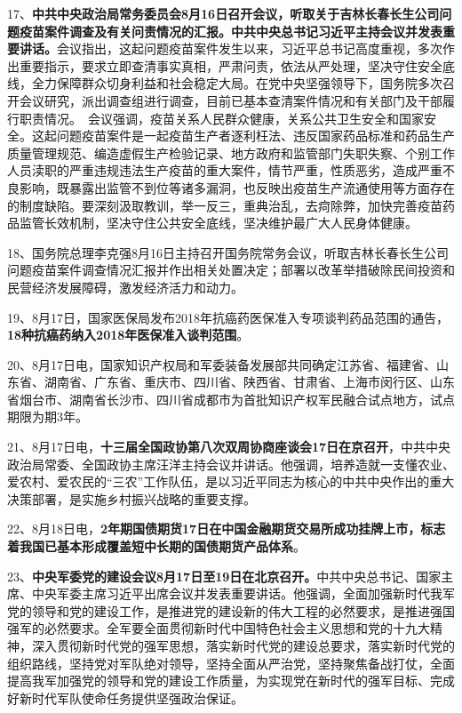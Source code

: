 17、{\textbf{中共中央政治局常务委员会8月16日召开会议，听取关于吉林长春长生公司问题疫苗案件调查及有关问责情况的汇报。中共中央总书记习近平主持会议并发表重要讲话。}}会议指出，这起问题疫苗案件发生以来，习近平总书记高度重视，多次作出重要指示，要求立即查清事实真相，严肃问责，依法从严处理，坚决守住安全底线，全力保障群众切身利益和社会稳定大局。在党中央坚强领导下，国务院多次召开会议研究，派出调查组进行调查，目前已基本查清案件情况和有关部门及干部履行职责情况。　会议强调，疫苗关系人民群众健康，关系公共卫生安全和国家安全。这起问题疫苗案件是一起疫苗生产者逐利枉法、违反国家药品标准和药品生产质量管理规范、编造虚假生产检验记录、地方政府和监管部门失职失察、个别工作人员渎职的严重违规违法生产疫苗的重大案件，情节严重，性质恶劣，造成严重不良影响，既暴露出监管不到位等诸多漏洞，也反映出疫苗生产流通使用等方面存在的制度缺陷。要深刻汲取教训，举一反三，重典治乱，去疴除弊，加快完善疫苗药品监管长效机制，坚决守住公共安全底线，坚决维护最广大人民身体健康。

18、国务院总理李克强8月16日主持召开国务院常务会议，听取吉林长春长生公司问题疫苗案件调查情况汇报并作出相关处置决定；部署以改革举措破除民间投资和民营经济发展障碍，激发经济活力和动力。

19、8月17日，国家医保局发布2018年抗癌药医保准入专项谈判药品范围的通告，\textbf{{18种抗癌药纳入2018年医保准入谈判范围}}。

20、8月17日电，国家知识产权局和军委装备发展部共同确定江苏省、福建省、山东省、湖南省、广东省、重庆市、四川省、陕西省、甘肃省、上海市闵行区、山东省烟台市、湖南省长沙市、四川省成都市为首批知识产权军民融合试点地方，试点期限为期3年。

21、8月17日电，{\textbf{十三届全国政协第八次双周协商座谈会17日在京召开}}，中共中央政治局常委、全国政协主席汪洋主持会议并讲话。他强调，培养造就一支懂农业、爱农村、爱农民的``三农''工作队伍，是以习近平同志为核心的中共中央作出的重大决策部署，是实施乡村振兴战略的重要支撑。

22、8月18日电，{\textbf{2年期国债期货17日在中国金融期货交易所成功挂牌上市，标志着我国已基本形成覆盖短中长期的国债期货产品体系}}。

23、{\textbf{中央军委党的建设会议8月17日至19日在北京召开。}}中共中央总书记、国家主席、中央军委主席习近平出席会议并发表重要讲话。他强调，全面加强新时代我军党的领导和党的建设工作，是推进党的建设新的伟大工程的必然要求，是推进强国强军的必然要求。全军要全面贯彻新时代中国特色社会主义思想和党的十九大精神，深入贯彻新时代党的强军思想，落实新时代党的建设总要求，落实新时代党的组织路线，坚持党对军队绝对领导，坚持全面从严治党，坚持聚焦备战打仗，全面提高我军加强党的领导和党的建设工作质量，为实现党在新时代的强军目标、完成好新时代军队使命任务提供坚强政治保证。

